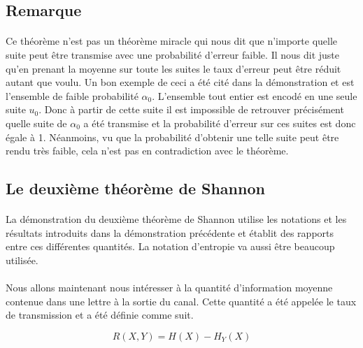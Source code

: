 \subsection*{Remarque}

	\paragraph{}
	Ce théorème n'est pas un théorème miracle qui nous dit que n'importe quelle
	suite peut être transmise avec une probabilité d'erreur faible.
	Il nous dit juste qu'en prenant la moyenne sur toute les suites le taux 
	d'erreur peut être réduit autant que voulu. Un bon exemple
	de ceci a été cité dans la démonstration et est l'ensemble de faible 
	probabilité $\alpha_0$. L'ensemble tout entier est encodé en une 
	seule suite $u_0$. Donc à partir de cette suite il est impossible 
	de retrouver précisément quelle suite de $\alpha_0$ a été transmise 
	et la probabilité d'erreur sur ces suites est donc égale à 1. 
	Néanmoins, vu que la probabilité d'obtenir une telle suite peut être 
	rendu très faible, cela n'est pas en contradiction avec le théorème.
	
	
	
	
	
	
	
	
	
	
	
	
	
\subsection{Le deuxième théorème de Shannon}

	\paragraph{}
	La démonstration du deuxième théorème de Shannon utilise 
	les notations et les résultats introduits dans la démonstration
	précédente et établit des rapports
	entre ces différentes quantités. La notation d'entropie va
	aussi être beaucoup utilisée.

	\paragraph{}
	Nous allons maintenant nous intéresser à la quantité
	d'information moyenne contenue dans une lettre à la sortie
	du canal. Cette quantité a été appelée le taux de transmission
	et a été définie comme suit.
	
	\[R(X,Y)=H(X)-H_Y(X)\]
	
